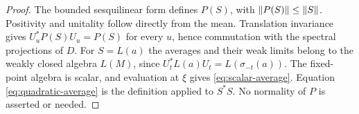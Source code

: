 \begin{proof}
The bounded sesquilinear form defines $P(S)$, with
$\lVert P(S)\rVert\le\lVert S\rVert$. Positivity and unitality follow directly from
the mean. Translation invariance gives $U_u^*P(S)U_u=P(S)$ for every
$u$, hence commutation with the spectral projections of $D$.
For $S=L(a)$ the averages and their weak limits belong to the weakly
closed algebra $L(M)$, since
$U_t^*L(a)U_t=L(\sigma_{-t}(a))$.
The fixed-point algebra is scalar, and evaluation at $\xi$ gives
\eqref{eq:scalar-average}. Equation \eqref{eq:quadratic-average} is the
definition applied to $S^*S$.
No normality of $P$ is asserted or needed.
\end{proof}
